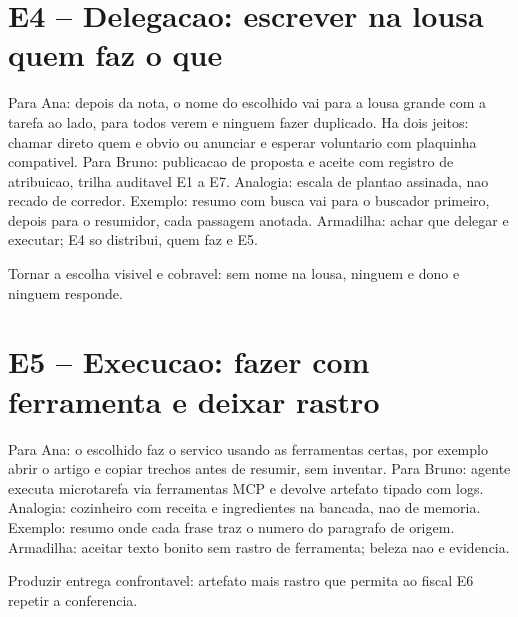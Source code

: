 \section{E4 -- Delegacao: escrever na lousa quem faz o que}


\begin{descricao}
Para Ana: depois da nota, o nome do escolhido vai para a lousa grande com a tarefa ao lado, para todos verem e ninguem fazer duplicado. Ha dois jeitos: chamar direto quem e obvio ou anunciar e esperar voluntario com plaquinha compativel. Para Bruno: publicacao de proposta e aceite com registro de atribuicao, trilha auditavel E1 a E7. Analogia: escala de plantao assinada, nao recado de corredor. Exemplo: resumo com busca vai para o buscador primeiro, depois para o resumidor, cada passagem anotada. Armadilha: achar que delegar e executar; E4 so distribui, quem faz e E5.
\end{descricao}

\begin{funcao}
Tornar a escolha visivel e cobravel: sem nome na lousa, ninguem e dono e ninguem responde.
\end{funcao}

\section{E5 -- Execucao: fazer com ferramenta e deixar rastro}


\begin{descricao}
Para Ana: o escolhido faz o servico usando as ferramentas certas, por exemplo abrir o artigo e copiar trechos antes de resumir, sem inventar. Para Bruno: agente executa microtarefa via ferramentas MCP e devolve artefato tipado com logs. Analogia: cozinheiro com receita e ingredientes na bancada, nao de memoria. Exemplo: resumo onde cada frase traz o numero do paragrafo de origem. Armadilha: aceitar texto bonito sem rastro de ferramenta; beleza nao e evidencia.
\end{descricao}

\begin{funcao}
Produzir entrega confrontavel: artefato mais rastro que permita ao fiscal E6 repetir a conferencia.
\end{funcao}

